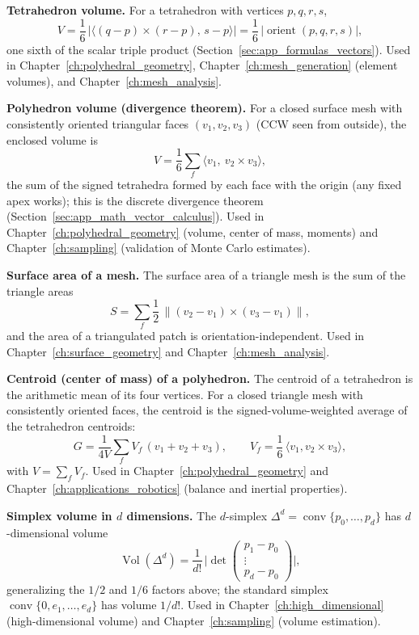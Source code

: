 \medskip\noindent\textbf{Tetrahedron volume.}
For a tetrahedron with vertices $p, q, r, s$,
\[
  V = \frac{1}{6}\,\bigl|\bigl\langle (q-p)\times(r-p),\, s-p\bigr\rangle\bigr|
  = \frac{1}{6}\,\bigl|\operatorname{orient}(p,q,r,s)\bigr|,
\]
one sixth of the scalar triple product (Section~\ref{sec:app_formulas_vectors}).
Used in Chapter~\ref{ch:polyhedral_geometry}, Chapter~\ref{ch:mesh_generation}
(element volumes), and Chapter~\ref{ch:mesh_analysis}.

\medskip\noindent\textbf{Polyhedron volume (divergence theorem).}
For a closed surface mesh with consistently oriented triangular faces
$(v_1, v_2, v_3)$ (CCW seen from outside), the enclosed volume is
\[
  V = \frac{1}{6}\sum_{f} \bigl\langle v_1,\ v_2\times v_3\bigr\rangle,
\]
the sum of the signed tetrahedra formed by each face with the origin
(any fixed apex works); this is the discrete divergence theorem
(Section~\ref{sec:app_math_vector_calculus}). Used in
Chapter~\ref{ch:polyhedral_geometry} (volume, center of mass, moments) and
Chapter~\ref{ch:sampling} (validation of Monte Carlo estimates).

\medskip\noindent\textbf{Surface area of a mesh.}
The surface area of a triangle mesh is the sum of the triangle areas
\[
  S = \sum_{f} \frac{1}{2}\,\bigl\|(v_2 - v_1)\times(v_3 - v_1)\bigr\|,
\]
and the area of a triangulated patch is orientation-independent. Used in
Chapter~\ref{ch:surface_geometry} and Chapter~\ref{ch:mesh_analysis}.

\medskip\noindent\textbf{Centroid (center of mass) of a polyhedron.}
The centroid of a tetrahedron is the arithmetic mean of its four vertices.
For a closed triangle mesh with consistently oriented faces, the centroid
is the signed-volume-weighted average of the tetrahedron centroids:
\[
  G = \frac{1}{4V}\sum_{f} V_f\,(v_1 + v_2 + v_3),
  \qquad
  V_f = \frac{1}{6}\,\langle v_1, v_2\times v_3\rangle,
\]
with $V = \sum_f V_f$. Used in Chapter~\ref{ch:polyhedral_geometry} and
Chapter~\ref{ch:applications_robotics} (balance and inertial properties).

\medskip\noindent\textbf{Simplex volume in $d$ dimensions.}
The $d$-simplex $\Delta^d = \operatorname{conv}\{p_0, \dots, p_d\}$ has
$d$-dimensional volume
\[
  \operatorname{Vol}(\Delta^d)
  = \frac{1}{d!}\,
  \biggl|\det\begin{pmatrix} p_1 - p_0 \\ \vdots \\ p_d - p_0 \end{pmatrix}\biggr|,
\]
generalizing the $1/2$ and $1/6$ factors above; the standard simplex
$\operatorname{conv}\{0, e_1, \dots, e_d\}$ has volume $1/d!$. Used in
Chapter~\ref{ch:high_dimensional} (high-dimensional volume) and
Chapter~\ref{ch:sampling} (volume estimation).


